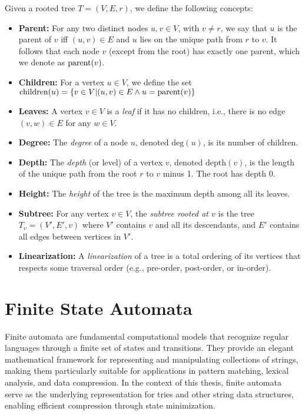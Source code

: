 \begin{definition} \label{def:tree_terminology}
Given a rooted tree $T = (V, E, r)$, we define the following concepts:
\begin{itemize}
    \item \textbf{Parent:} For any two distinct nodes $u,v\in V$, with $v\neq r$, we say that $u$ is the parent of $v$ iff $(u, v) \in E$ and $u$ lies on the unique path from $r$ to $v$. It follows that each node $v$ (except from the root) has exactly one parent, which we denote as $\textup{parent}(v)$. 
    \item \textbf{Children:} For a vertex $u\in V$, we define the set $\textup{children}(u) = \{v \in V | (u,v)\in E \land u = \textup{parent}(v)\}$
    \item \textbf{Leaves:} A vertex $v \in V$ is a \textit{leaf} if it has no children, i.e., there is no edge $(v, w) \in E$ for any $w \in V$.
    \item \textbf{Degree:} The \textit{degree} of a node $u$, denoted $\text{deg}(u)$, is its number of children.
    \item \textbf{Depth:} The \textit{depth} (or level) of a vertex $v$, denoted $\text{depth}(v)$, is the length of the unique path from the root $r$ to $v$ minus 1. The root has depth 0.
    \item \textbf{Height:} The \textit{height} of the tree is the maximum depth among all its leaves.
    \item \textbf{Subtree:} For any vertex $v \in V$, the \textit{subtree rooted at $v$} is the tree $T_v = (V', E', v)$ where $V'$ contains $v$ and all its descendants, and $E'$ contains all edges between vertices in $V'$.
    \item \textbf{Linearization:} A \textit{linearization} of a tree is a total ordering of its vertices that respects some traversal order (e.g., pre-order, post-order, or in-order).
\end{itemize}
\end{definition}


\section{Finite State Automata} \label{sed:fsa}
Finite automata are fundamental computational models that recognize regular languages through a finite set of states and transitions. They provide an elegant mathematical framework for representing and manipulating collections of strings, making them particularly suitable for applications in pattern matching, lexical analysis, and data compression. In the context of this thesis, finite automata serve as the underlying representation for tries and other string data structures, enabling efficient compression through state minimization.

